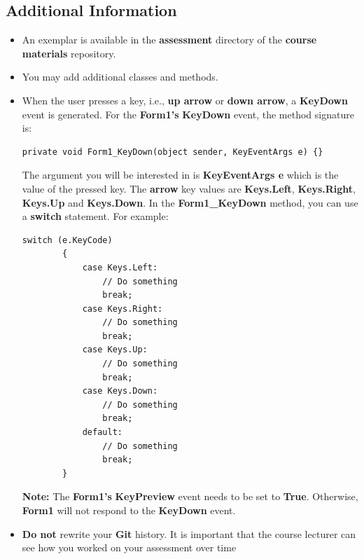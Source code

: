 \documentclass{article}
\begin{document}
\subsection*{Additional Information}
\begin{itemize}
    \item An exemplar is available in the \textbf{assessment} directory of the \textbf{course materials} repository.
    \item You may add additional classes and methods.
    \item When the user presses a key, i.e., \textbf{up arrow} or \textbf{down arrow}, a \textbf{KeyDown} event is generated. For the \textbf{Form1's} \textbf{KeyDown} event, the method signature is:
    \begin{Verbatim}[tabsize=2]
		private void Form1_KeyDown(object sender, KeyEventArgs e) {}
	\end{Verbatim}
	The argument you will be interested in is \textbf{KeyEventArgs e} which is the value of the pressed key. The \textbf{arrow} key values are \textbf{Keys.Left}, \textbf{Keys.Right}, \textbf{Keys.Up} and \textbf{Keys.Down}. In the \textbf{Form1\_KeyDown} method, you can use a \textbf{switch} statement. For example:
	\begin{Verbatim}[tabsize=2]
		switch (e.KeyCode) 
		{
			case Keys.Left:
				// Do something
				break;
			case Keys.Right:
				// Do something
				break;
			case Keys.Up:
				// Do something
				break;
			case Keys.Down:
				// Do something
				break;
			default:
				// Do something
				break;
		}
	\end{Verbatim}
	\textbf{Note:} The \textbf{Form1's} \textbf{KeyPreview} event needs to be set to \textbf{True}. Otherwise, \textbf{Form1} will not respond to the \textbf{KeyDown} event.
    \item \textbf{Do not} rewrite your \textbf{Git} history. It is important that the course lecturer can see how you worked on your assessment over time
\end{itemize}
\end{document}
